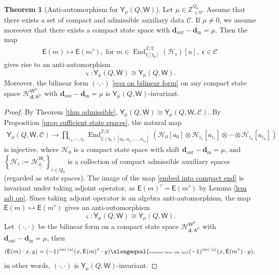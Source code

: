\documentclass[10pt]{amsart}
\theoremstyle{definition}
\newtheorem{Theorem}{Theorem}[section]
\numberwithin{equation}{section}
\newcommand{\bC}{\mathbb{C}}
\newcommand{\bZ}{\mathbb{Z}}
\newcommand{\bd}{\mathbf{d}}
\newcommand{\cH}{\mathcal{H}}
\newcommand{\sA}{\mathsf{A}}
\newcommand{\sW}{\mathsf{W}}
\newcommand{\End}{\operatorname{End}}
\newcommand{\In}{\operatorname{in}}
\newcommand{\Out}{\operatorname{out}}
\begin{document}
\begin{Theorem}[Anti-automorphism for $\mathsf Y_{\mu}(Q,\sW)$]\label{thm anti-auto RTT Yangian}
Let $\mu\in \bZ_{\leqslant 0}^{Q_0}$. Assume that there exists a set of compact and admissible auxiliary data $\mathcal C$. If $\mu\neq 0$, we assume moreover that there exists a compact state space with $\bd_{\Out}-\bd_{\In}=\mu$. Then the map
\begin{align*}
    \mathsf E(m)\mapsto \mathsf E(m^{\tau}),\;\text{for }m\in \End^{\bZ/2}_{\bC[\mathsf t_0]}(\cH_{\mathfrak{c}})[u],\;\mathfrak{c}\in \mathcal C
\end{align*}
gives rise to an anti-automorphism $$\varsigma\colon \mathsf Y_{\mu}(Q,\sW)\cong \mathsf Y_{\mu}(Q,\sW).$$ 
Moreover, the bilinear form $(\cdot,\cdot)$ \eqref{equ on bilinear form} on any compact state space $\cH^{\sW^{\mathrm{fr}}}_{\underline{\bd},\sA^{\mathrm{fr}}}$ with $\bd_{\Out}-\bd_{\In}=\mu$ is $\mathsf Y_{\mu}(Q,\sW)$-invariant.
\end{Theorem}

\begin{proof}
By Theorem \ref{thm admissible}, $\mathsf Y_{\mu}(Q,\sW)\cong \mathsf Y_{\mu}(Q,\sW,\mathcal C)$. By Proposition \ref{prop sufficient state spaces}, the natural map
\begin{align}\label{embed into compact end}
    \mathsf Y_\mu(Q,\sW,\mathcal C)\longrightarrow \prod_{i_1,\cdots,i_n}\End^{\bZ/2}_{\bC(\mathsf t_0)[a_{0},a_{i_1},\ldots,a_{i_n}]}\left(\cH_0[a_0]\otimes\cH_{i_1}[a_{i_1}]\otimes\cdots\otimes \cH_{i_n}[a_{i_n}]\right)
\end{align}
is injective, where $\cH_0$ is a compact state space with shift $\bd_{\Out}-\bd_{\In}=\mu$, and $\left\{\cH_i:=\cH^{\sW_i}_{\underline{\delta_i}}\right\}_{i\in Q_0}$ is a collection of compact admissible auxiliary spaces (regarded as state spaces). The image of the map \eqref{embed into compact end} is invariant under taking adjoint operator, as $\mathsf E(m)^\tau=\mathsf E(m^\tau)$ by Lemma \ref{lem adj op}. Since taking adjoint operator is an algebra anti-automorphism, the map $\mathsf E(m)\mapsto \mathsf E(m^{\tau})$ gives an anti-automorphism $$\varsigma\colon \mathsf Y_{\mu}(Q,\sW)\cong \mathsf Y_{\mu}(Q,\sW).$$ Let $(\cdot,\cdot)$ be the bilinear form on a compact state space $\cH^{\sW^{\mathrm{fr}}}_{\underline{\bd},\sA^{\mathrm{fr}}}$ with $\bd_{\Out}-\bd_{\In}=\mu$, then
\begin{align*}
    (\mathsf E(m)\cdot x,y)=(-1)^{|m|\cdot|x|}(x,\mathsf E(m)^{\tau}\cdot y)\xlongequal{\scriptscriptstyle \text{Lemma \ref{lem adj op}}} (-1)^{|m|\cdot|x|}(x,\mathsf E(m^{\tau})\cdot y),
\end{align*}
in other words, $(\cdot,\cdot)$ is $\mathsf Y_{\mu}(Q,\sW)$-invariant.
\end{proof}
\end{document}
